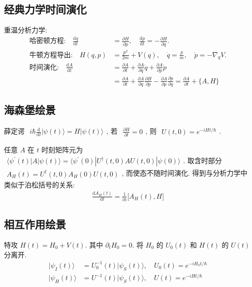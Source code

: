 \documentclass[../../main.tex]{subfiles}
\begin{document}
\subsection{经典力学时间演化}
重温分析力学:
\begin{align*}
    \text{哈密顿方程:}\quad\frac{\mathrm{d}q}{\mathrm{d}t} &= \frac{\partial H}{\partial p},\quad \frac{\mathrm{d} p}{\mathrm{d}t} = -\frac{\partial H}{\partial q}.\\
    \text{牛顿方程导出:}\quad H(q,p) &= \frac{p^{2}}{2m} + V(q),\quad \dot{q} = \frac{p}{m},\quad \dot{p} = -\nabla_{q}V.\\
    \text{时间演化:}\quad\frac{\mathrm{d}A}{\mathrm{d}t} &= \frac{\partial A}{\partial t} + \frac{\partial A}{\partial q}\dot{q} + \frac{\partial A}{\partial p}\dot{p}\\
    &= \frac{\partial A}{\partial t} + \frac{\partial A}{\partial q}\frac{\partial H}{\partial p} - \frac{\partial A}{\partial p}\frac{\partial p}{\partial q} = \frac{\partial A}{\partial t} + \{A,H\}
\end{align*}
\subsection{海森堡绘景}
薛定谔 $\begin{aligned}
    i\hbar\frac{\mathrm{d}}{\mathrm{d}t}|\psi(t)\rangle = H|\psi(t)\rangle
\end{aligned}$, 若 $\begin{aligned}
    \frac{\partial H}{\partial t} = 0
\end{aligned}$, 则 $\begin{aligned}
    U(t,0) = e^{-iHt/\hbar}
\end{aligned}$. 

任意 $A$ 在 $t$ 时刻矩阵元为 $\begin{aligned}
    \langle\psi^{\prime}(t)|A|\psi(t)\rangle = \langle\psi^{\prime}(0)|U^{\dagger}(t,0)AU(t,0)|\psi(0)\rangle
\end{aligned}$. 取含时部分 $\begin{aligned}
    A_{H}(t) = U^{\dagger}(t,0)A_{H}(0)U(t,0)
\end{aligned}$, 而使态不随时间演化. 
得到与分析力学中类似于泊松括号的关系:
\begin{align*}
    \frac{\mathrm{d}A_{H}(t)}{\mathrm{d}t} = \frac{1}{i\hbar}\bigg[A_{H}(t),H\bigg]
\end{align*}
\subsection{相互作用绘景}
特攻 $H(t) = H_{0} + V(t)$. 其中 $\partial_{t}H_{0}=0$. 将 $H_{0}$ 的 $U_{0}(t)$ 和 $H(t)$ 的 $U(t)$ 分离开. 
\begin{align*}
    |\psi_{I}(t)\rangle &= U_{0}^{-1}(t)|\psi_{S}(t)\rangle,\quad U_{0}(t) = e^{-iH_{0}t/\hbar}\\
    |\psi_{H}(t)\rangle &= U^{-1}(t)|\psi_{S}(t)\rangle,\quad U(t) = e^{-iHt/\hbar}
\end{align*}
\end{document}
